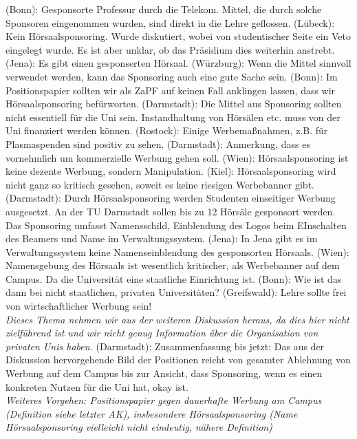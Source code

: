 		\begin{outline}
			\1 (Bonn): Gesponsorte Professur durch die Telekom. Mittel, die durch solche Sponsoren eingenommen wurden, sind direkt in die Lehre geflossen.
			\1 (Lübeck): Kein Hörsaalsponsoring. Wurde diskutiert, wobei von studentischer Seite ein Veto eingelegt wurde. Es ist aber unklar, ob das Präsidium dies weiterhin anstrebt.
			\1 (Jena): Es gibt einen gesponserten Hörsaal.
			\1 (Würzburg): Wenn die Mittel sinnvoll verwendet werden, kann das Sponsoring auch eine gute Sache sein.
			\1 (Bonn): Im Positionspapier sollten wir als ZaPF auf keinen Fall anklingen lassen, dass wir Hörsaalsponsoring befürworten.
			\1 (Darmstadt): Die Mittel aus Sponsoring sollten nicht essentiell für die Uni sein. Instandhaltung von Hörsälen etc. muss von der Uni finanziert werden können.
			\1 (Rostock): Einige Werbemaßnahmen, z.B. für Plasmaspenden sind positiv zu sehen.
			\1 (Darmstadt): Anmerkung, dass es vornehmlich um kommerzielle Werbung gehen soll.
			\1 (Wien): Hörsaalsponsoring ist keine dezente Werbung, sondern Manipulation.
			\1 (Kiel): Hörsaalsponsoring wird nicht ganz so kritisch gesehen, soweit es keine riesigen Werbebanner gibt.
			\1 (Darmstadt): Durch Hörsaalsponsoring werden Studenten einseitiger Werbung ausgesetzt. An der TU Darmstadt sollen bis zu 12 Hörsäle gesponsort werden. Das Sponsoring umfasst Namensschild, Einblendung des Logos beim EInschalten des Beamers und Name im Verwaltungssystem.
			\1 (Jena): In Jena gibt es im Verwaltungssystem keine Namenseinblendung des gesponsorten Hörsaals.
			\1 (Wien): Namensgebung des Hörsaals ist wesentlich kritischer, als Werbebanner auf dem Campus. Da die Universität eine staatliche Einrichtung ist.
			\1 (Bonn): Wie ist das dann bei nicht staatlichen, privaten Universitäten?
			\1 (Greifswald): Lehre sollte frei von wirtschaftlicher Werbung sein! \\
			\textit{Dieses Thema nehmen wir aus der weiteren Diskussion heraus, da dies hier nicht zielführend ist und wir nicht genug Information über die Organisation von privaten Unis haben.}
			\1 (Darmstadt): Zusammenfassung bis jetzt: Das aus der Diskussion hervorgehende Bild der Positionen reicht von gesamter Ablehnung von Werbung auf dem Campus bis zur Ansicht, dass Sponsoring, wenn es einen konkreten Nutzen für die Uni hat, okay ist. \\
			\textit{Weiteres Vorgehen: Positionspapier gegen dauerhafte Werbung am Campus (Definition siehe letzter AK), insbesondere Hörsaalsponsoring (Name Hörsaalsponsoring vielleicht nicht eindeutig, nähere Definition)}

\end{outline}
